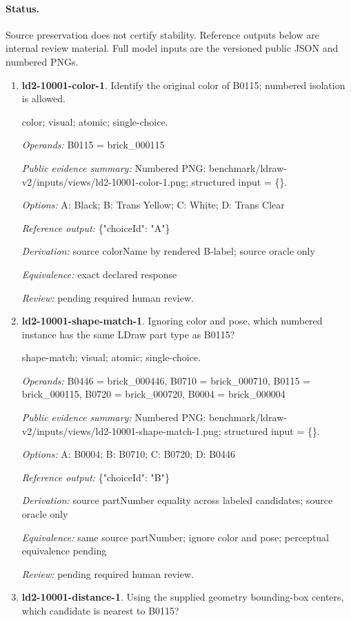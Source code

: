 \paragraph{Status.}Source preservation does not certify stability. Reference outputs below are internal review material. Full model inputs are the versioned public JSON and numbered PNGs.
\begin{enumerate}
\item \textbf{ld2-10001-color-1}. Identify the original color of B0115; numbered isolation is allowed.
\par{\small color; visual; atomic; single-choice.\par\textit{Operands:} B0115 = brick\_000115\par\textit{Public evidence summary:} Numbered PNG: benchmark/ldraw-v2/inputs/views/ld2-10001-color-1.png; structured input = \{\}.\par\textit{Options:} A: Black; B: Trans Yellow; C: White; D: Trans Clear\par\textit{Reference output:} \{"choiceId": "A"\}\par\textit{Derivation:} source colorName by rendered B-label; source oracle only\par\textit{Equivalence:} exact declared response\par\textit{Review:} pending required human review.}
\item \textbf{ld2-10001-shape-match-1}. Ignoring color and pose, which numbered instance has the same LDraw part type as B0115?
\par{\small shape-match; visual; atomic; single-choice.\par\textit{Operands:} B0446 = brick\_000446, B0710 = brick\_000710, B0115 = brick\_000115, B0720 = brick\_000720, B0004 = brick\_000004\par\textit{Public evidence summary:} Numbered PNG: benchmark/ldraw-v2/inputs/views/ld2-10001-shape-match-1.png; structured input = \{\}.\par\textit{Options:} A: B0004; B: B0710; C: B0720; D: B0446\par\textit{Reference output:} \{"choiceId": "B"\}\par\textit{Derivation:} source partNumber equality across labeled candidates; source oracle only\par\textit{Equivalence:} same source partNumber; ignore color and pose; perceptual equivalence pending\par\textit{Review:} pending required human review.}
\item \textbf{ld2-10001-distance-1}. Using the supplied geometry bounding-box centers, which candidate is nearest to B0115?

\end{enumerate}
